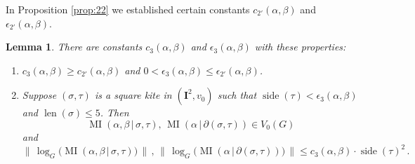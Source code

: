 \documentclass[10pt, a4paper]{amsart}
\newtheorem{lem}[equation]{Lemma}
\theoremstyle{definition}
\numberwithin{equation}{section}
\newcommand{\opn}{\operatorname}
\newcommand{\mbf}[1]{\mathbf{#1}}
\newcommand{\Norm}[1]{\bigl\lVert\, #1 \, \bigr\rVert}
\renewcommand{\vert}{\, | \,}
\newcommand{\lb}{\linebreak}
\begin{document}
In Proposition \ref{prop:22} we established certain constants 
$c_{2'}(\alpha, \beta)$ and \lb $\epsilon_{2'}(\alpha, \beta)$.

\begin{lem} \label{lem:9}
There are constants $c_3(\alpha, \beta)$ and
$\epsilon_3(\alpha, \beta)$ with these properties:
\begin{enumerate}
\item $c_3(\alpha, \beta) \geq c_{2'}(\alpha, \beta)$ and
$0 < \epsilon_3(\alpha, \beta) \leq \epsilon_{2'}(\alpha, \beta)$.
\item Suppose $(\sigma, \tau)$ is a square kite in $(\mbf{I}^2, v_0)$
such that 
$\opn{side}(\tau) < \epsilon_3(\alpha, \beta)$ and
$\opn{len}(\sigma) \leq 5$. Then
\[ \opn{MI} (\alpha, \beta \vert \sigma, \tau) , \,
\opn{MI} (\alpha \vert \partial(\sigma, \tau)) \in V_0(G)  \]
and
\[ \Norm{ \log_G \bigl( \opn{MI} (\alpha, \beta \vert \sigma, \tau) \bigr) }
\, , \, 
\Norm{ \log_G \bigl( \opn{MI} (\alpha \vert \partial(\sigma, \tau)) \bigr) }
\leq c_3(\alpha, \beta) \cdot \opn{side}(\tau)^2  \, . \]
\end{enumerate}
\end{lem}
\end{document}
